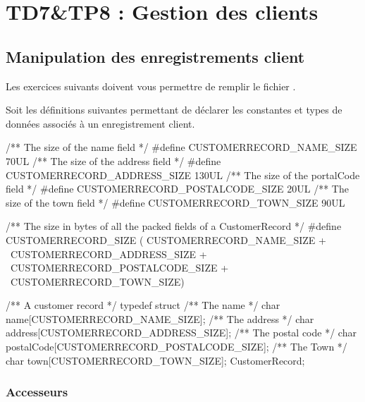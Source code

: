 \chapter{TD7\&TP8 : Gestion des clients}

\section{Manipulation des enregistrements client}

Les exercices suivants doivent vous permettre de remplir le fichier .

Soit les définitions suivantes permettant de déclarer les constantes et types de données associés à un enregistrement client.
\begin{csource}
/** The size of the name field */
#define CUSTOMERRECORD_NAME_SIZE 70UL
/** The size of the address field */
#define CUSTOMERRECORD_ADDRESS_SIZE 130UL
/** The size of the portalCode field */
#define CUSTOMERRECORD_POSTALCODE_SIZE 20UL
/** The size of the town field */
#define CUSTOMERRECORD_TOWN_SIZE 90UL

/** The size in bytes of all the packed fields of a CustomerRecord */
#define CUSTOMERRECORD_SIZE (    CUSTOMERRECORD_NAME_SIZE + \
                                 CUSTOMERRECORD_ADDRESS_SIZE + \
                                 CUSTOMERRECORD_POSTALCODE_SIZE + \
                                 CUSTOMERRECORD_TOWN_SIZE)

/** A customer record */
typedef struct {
    /** The name */
    char name[CUSTOMERRECORD_NAME_SIZE];
    /** The address */
    char address[CUSTOMERRECORD_ADDRESS_SIZE];
    /** The postal code */
    char postalCode[CUSTOMERRECORD_POSTALCODE_SIZE];
    /** The Town */
    char town[CUSTOMERRECORD_TOWN_SIZE];
} CustomerRecord;
\end{csource}

\subsection{Accesseurs}

